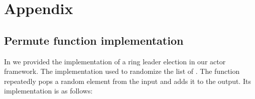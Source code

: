 \documentclass[sigplan,screen]{acmart}
\begin{document}











\appendix

\section{Appendix}

\subsection{Permute function implementation}
\label{apx:permute-impl}

In  we provided the implementation of a ring
leader election in our actor framework.
%
The implementation used  to randomize the list of
.
%
The  function repeatedly pops a random element from the input and adds it to the output.
%
Its implementation is as follows:
%
\end{document}
